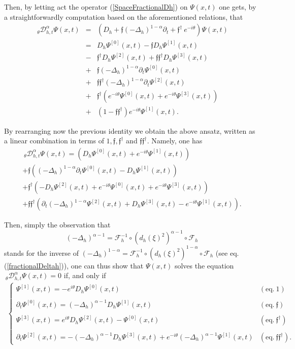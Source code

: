 \documentclass{elsarticle}
\newcommand{\f}{{\mathfrak f}}
\begin{document}
Then, by letting act the operator (\ref{SpaceFractionalDh}) on $\Psi(x,t)$ one gets, by a straightforwardly computation based on the aforementioned relations, that
\begin{eqnarray*}
	{~}_\theta \mathcal{D}_{h,t}^\alpha\Psi(x,t)&=&	\left(D_h+\f (-\Delta_h)^{1-\alpha}\partial_t+ \f^\dagger~e^{-i\theta}\right)\Psi(x,t) \\
	&=&D_h\Psi^{[0]}(x,t)-\f D_h\Psi^{[1]}(x,t)\\
	&-&\f^\dagger D_h\Psi^{[2]}(x,t)+\f\f^\dagger D_h\Psi^{[3]}(x,t) 
	\\
	&+&\f(-\Delta_h)^{1-\alpha}\partial_t\Psi^{[0]}(x,t)\\
	&+&\f\f^\dagger(-\Delta_h)^{1-\alpha}\partial_t\Psi^{[2]}(x,t)\\
	&+&\f^\dagger\left(e^{-i\theta}\Psi^{[0]}(x,t)+e^{-i\theta}\Psi^{[3]}(x,t)\right)\\
	&+&(1-\f\f^\dagger)e^{-i\theta}\Psi^{[1]}(x,t).
\end{eqnarray*}

By rearranging now the previous identity we obtain the above ansatz, written as a linear combination in terms of $1,\f,\f^\dagger$ and $\f\f^\dagger$. Namely, one has
\begin{eqnarray*}
	{~}_\theta \mathcal{D}_{h,t}^\alpha\Psi(x,t) = \left(D_h\Psi^{[0]}(x,t)+e^{-i\theta}\Psi^{[1]}(x,t)\right) \\
	+\f\left((-\Delta_h)^{1-\alpha}\partial_t\Psi^{[0]}(x,t)-D_h\Psi^{[1]}(x,t)\right)\\
	+\f^\dagger\left(-D_h\Psi^{[2]}(x,t)+e^{-i\theta}\Psi^{[0]}(x,t)+e^{-i\theta}\Psi^{[3]}(x,t)\right)
	\\
	+\f\f^\dagger\left(\partial_t(-\Delta_h)^{1-\alpha}\Psi^{[2]}(x,t)+D_h\Psi^{[3]}(x,t)-e^{-i\theta}\Psi^{[1]}(x,t)\right).
\end{eqnarray*}

Then, simply the observation that $$(-\Delta_h)^{\alpha-1}=\mathcal{F}_h^{-1}\circ (d_h(\xi)^2)^{\alpha-1}\circ \mathcal{F}_h$$ stands for the inverse of $(-\Delta_h)^{1-\alpha}=\mathcal{F}_h^{-1}\circ (d_h(\xi)^2)^{1-\alpha}\circ \mathcal{F}_h$ (see eq. (\ref{fractionalDeltah})), one can thus show that $\Psi(x,t)$ solves the equation ${~}_\theta \mathcal{D}_{h,t}^\alpha\Psi(x,t)=0$ if, and only if
\begin{eqnarray}
	\label{CoupledSystemsDiracAlpha} \left\{\begin{array}{lll} 
		\Psi^{[1]}(x,t)=-e^{i\theta}D_h\Psi^{[0]}(x,t) & (\mbox{eq.}~1) &
		\\ \ \\
		\partial_t\Psi^{[0]}(x,t)=(-\Delta_h)^{\alpha-1}D_h\Psi^{[1]}(x,t) & (\mbox{eq.}~\f)&\\ \ \\
		\Psi^{[3]}(x,t)=e^{i\theta}D_h\Psi^{[2]}(x,t)-\Psi^{[0]}(x,t) &   (\mbox{eq.}~\f^\dagger) & \\ \ \\
		\partial_t\Psi^{[2]}(x,t)=-(-\Delta_h)^{\alpha-1}D_h\Psi^{[3]}(x,t)+e^{-i\theta}(-\Delta_h)^{\alpha-1}\Psi^{[1]}(x,t) &   (\mbox{eq.}~\f\f^\dagger). &
	\end{array}\right.
\end{eqnarray}
\end{document}
